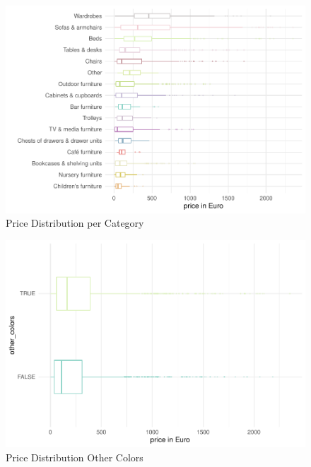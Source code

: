 \documentclass[a4paper, nobind]{templates/ociamthesis}
\begin{document}
\begin{figure}
\includegraphics[width=1\linewidth]{_main_files/figure-latex/price-dist-per-category-1} \caption{Price Distribution per Category}\label{fig:price-dist-per-category}
\end{figure}

\begin{figure}
\includegraphics[width=1\linewidth]{_main_files/figure-latex/price-dist-other-colors-1} \caption{Price Distribution Other Colors}\label{fig:price-dist-other-colors}
\end{figure}
\end{document}
